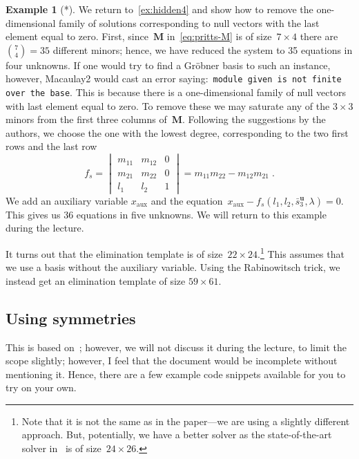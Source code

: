 \documentclass[11pt,a4paper]{article}
\theoremstyle{definition}
\newtheorem{example}{Example}
\newcommand{\te}[1]{\text{#1}}
\newcommand{\mat}[1]{\bm{#1}}
\begin{document}
\begin{example}[*]
We return to~\cref{ex:hidden4} and show how to remove the one-dimensional family of solutions
corresponding to null vectors with the last element equal to zero.
First, since~$\mat{M}$ in~\eqref{eq:pritts-M} is of size~$7\times 4$ there are $\binom{7}{4}=35$
different minors; hence, we have reduced the system to 35 equations in four unknowns.
If one would try to find a Gröbner basis to such an instance, however, Macaulay2 would
cast an error saying:~\texttt{module given is not finite over the base}. This is because
there is a one-dimensional family of null vectors with last element equal to zero. To remove
these we may saturate any of the $3\times 3$ minors from the first three columns of~$\mat{M}$.
Following the suggestions by the authors, we choose the one with the lowest degree, corresponding
to the two first rows and the last row
\begin{equation}
    f_s =
        \begin{vmatrix}
        m_{11} & m_{12} & 0\\
        m_{21} & m_{22} & 0\\
        l_1 & l_2 &   1
        \end{vmatrix}
        =
        m_{11}m_{22}-m_{12}m_{21}\;.
\end{equation}
We add an auxiliary variable $x_{\te{aux}}$ and  the equation~$x_{\te{aux}}-f_s(l_1,l_2,\bar{s}_3^{\mat{u}},\lambda) = 0$. This gives us 36 equations in five unknowns. We will return to this example
during the lecture.

It turns out that the elimination template is of size~$22\times 24$.\footnote{Note that it is not
the same as in the paper---we are using a slightly different approach. But, potentially, we have
a better solver as the state-of-the-art solver in~\cite{pritts2017} is of size~$24\times 26$.}
This assumes that we use a basis without the auxiliary variable. Using the Rabinowitsch trick,
we instead get an elimination template of size $59\times 61$.
\end{example}

\subsection{Using symmetries}
This is based on~\cite{larsson2016eccv}; however, we will not discuss it during the lecture,
to limit the scope slightly; however, I feel that the document would be incomplete without
mentioning it. Hence, there are a few example code snippets available for you to try on your own.
\end{document}
